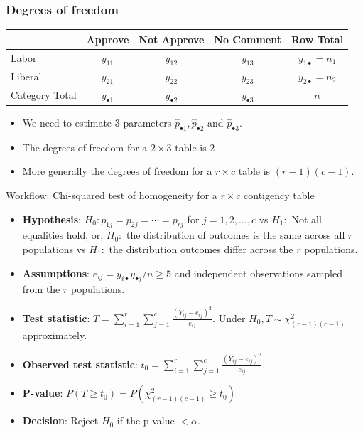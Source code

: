\documentclass[a4paper]{article}
\begin{document}
\subsubsection{Degrees of freedom}
\begin{table}[H]
	\centering
	\begin{tabular}{@{}lcccc@{}}
	\toprule
				   & Approve  			 & Not Approve 		   & No Comment			 & Row Total                 \\ \midrule
	Labor   	   & \( y_{11} \)		 & \( y_{12} \) 	   & \( y_{13} \) 		 & \( y_{1 \bullet} = n_1 \) \\
	Liberal   	   & \( y_{21} \) 		 & \( y_{22} \) 	   & \( y_{23} \) 		 & \( y_{2 \bullet} = n_2 \) \\ \midrule
	Category Total & \( y_{\bullet 1} \) & \( y_{\bullet 2} \) & \( y_{\bullet 3} \) & \( n \) 				 \\ \bottomrule
	\end{tabular}
\end{table}
\begin{itemize}
	\item We need to estimate 3 parameters \( \hat{p}_{\bullet 1},\hat{p}_{\bullet 2} \) and \( \hat{p}_{\bullet 3} \).
	\item The degrees of freedom for a \( 2 \times 3 \) table is 2
	\item More generally the degrees of freedom for a \( r \times c \) table is \( (r-1)(c-1) \).
\end{itemize}
\begin{redbox}{Workflow: Chi-squared test of homogeneity for a \( r \times c \) contigency table}
	\begin{itemize}
		\item \textbf{Hypothesis}: \( H_0: p_{1j} = p_{2j} = \dotsb = p_{rj} \) for \( j = 1,2,\dotsc,c \) vs \( H_1: \) Not all equalities hold, or, \( H_0: \) the distribution of outcomes is the same across all \( r \) populations vs \( H_1: \) the distribution outcomes differ across the \( r \) populations. 
		\item \textbf{Assumptions}: \( e_{ij} =y_{i \bullet} y_{\bullet j}/n \geq 5 \) and independent observations sampled from the \( r \) populations.
		\item \textbf{Test statistic}: \( T = \sum\limits_{i=1}^{r}\sum\limits_{j=1}^{c} \frac{(Y_{ij} - e_{ij})^2}{e_{ij}} \). Under \( H_0, T \sim \chi^2_{(r-1)(c-1)} \) approximately.
		\item \textbf{Observed test statistic}: \( t_0 = \sum\limits_{i=1}^{r}\sum\limits_{j=1}^{c} \frac{(Y_{ij} - e_{ij})^2}{e_{ij}} \).
		\item \textbf{P-value}: \( P(T\geq t_0) = P(\chi^2_{(r-1)(c-1)} \geq t_0) \)
		\item \textbf{Decision}: Reject \( H_0 \) if the p-value \( < \alpha \).
	\end{itemize}
\end{redbox}
\end{document}
